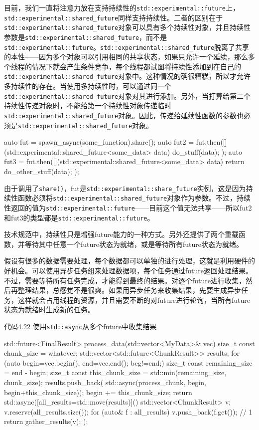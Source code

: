 目前，我们一直将注意力放在支持持续性的\texttt{std::experimental::future}上，\texttt{std::experimental::shared\_future}同样支持持续性。二者的区别在于\texttt{std::experimental::shared\_future}对象可以具有多个持续性对象，并且持续性参数是\texttt{std::experimental::shared\_future}，而不是\texttt{std::experimental::future}。\texttt{std::experimental::shared\_future}脱离了共享的本性——因为多个对象可以引用相同的共享状态，如果只允许一个延续，那么多个线程的情况下就会产生条件竞争，每个线程都试图将持续性添加到在自己的\texttt{std::experimental::shared\_future}对象中。这种情况的确很糟糕，所以才允许多持续性的存在。当使用多持续性时，可以通过同一个\texttt{std::experimental::shared\_future}对象对其进行添加。另外，当打算给第二个持续性传递对象时，不能给第一个持续性对象传递临时\texttt{std::experimental::shared\_future}对象。因此，传递给延续性函数的参数也必须是\texttt{std::experimental::shared\_future}对象。

\begin{cpp}
auto fut = spawn_async(some_function).share();
auto fut2 = fut.then([](std::experimental::shared_future<some_data> data){
      do_stuff(data);
    });
auto fut3 = fut.then([](std::experimental::shared_future<some_data> data){
      return do_other_stuff(data);
    });
\end{cpp}

由于调用了\texttt{share()}，fut是\texttt{std::experimental::share\_future}实例，这是因为持续性函数必须将\texttt{std::experimental::shared\_future}对象作为参数。不过，持续性返回的值为\texttt{std::experimental::future}——目前这个值无法共享——所以fut2和fut3的类型都是\texttt{std::experimental::future}。

技术规范中，持续性只是增强future能力的一种方式。另外还提供了两个重载函数，并等待其中任意一个future状态为就绪，或是等待所有future状态为就绪。


假设有很多的数据需要处理，每个数据都可以单独的进行处理，这就是利用硬件的好机会。可以使用异步任务组来处理数据项，每个任务通过future返回处理结果。不过，需要等待所有任务完成，才能得到最终的结果。对逐个future进行收集，然后再整理结果，总感觉不是很爽。如果用异步任务来收集结果，先要生成异步任务，这样就会占用线程的资源，并且需要不断的对future进行轮询，当所有future状态为就绪时生成新的任务。

代码4.22 使用\texttt{std::async}从多个future中收集结果

\begin{cpp}
std::future<FinalResult> process_data(std::vector<MyData>& vec)
{
  size_t const chunk_size = whatever;
  std::vector<std::future<ChunkResult>> results;
  for (auto begin=vec.begin(), end=vec.end(); beg!=end;){
    size_t const remaining_size = end - begin;
    size_t const this_chunk_size = std::min(remaining_size, chunk_size);
    results.push_back(
      std::async(process_chunk, begin, begin+this_chunk_size));
    begin += this_chunk_size;
  }
  return std::async([all_results=std::move(results)](){
    std::vector<ChunkResult> v;
    v.reserve(all_results.size());
    for (auto& f : all_results)
    {
      v.push_back(f.get()); // 1
    }
    return gather_results(v);
  });
}
\end{cpp}

